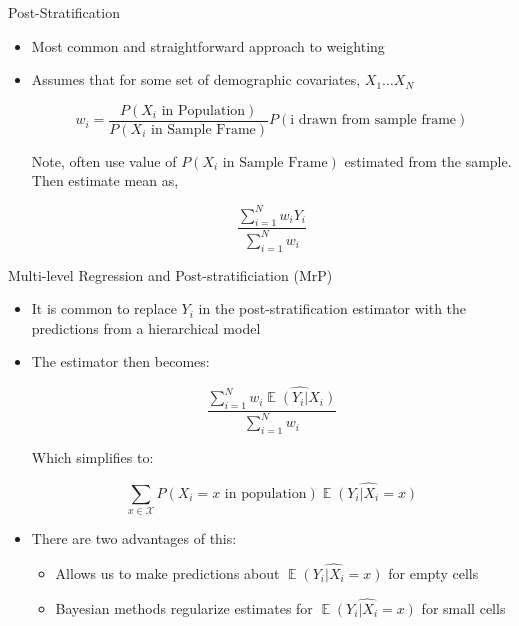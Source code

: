 \documentclass{beamer}
\DeclareMathOperator*{\E}{\mathbb{E}}
\begin{document}
\begin{frame}{Post-Stratification}
\begin{itemize} 
\item Most common and straightforward approach to weighting \pause 
\item Assumes that for some set of demographic covariates, $X_1 \dots X_N$ %

$$
w_i = \frac{P(X_i \text{ in Population})}{P(X_i \text{ in Sample Frame})} P(\text{i drawn from sample frame})
$$

Note, often use value of $P(X_i \text{ in Sample Frame})$ estimated from the sample. \pause Then estimate mean as, \pause 

$$
\frac{\sum_{i =1}^N w_i Y_i}{\sum_{i=1}^N w_i}
$$

\end{itemize}
\end{frame}


\begin{frame}{Multi-level Regression and Post-stratificiation (MrP)}
	\begin{itemize} 
		\item It is common to replace $Y_i$ in the post-stratification estimator with the predictions from a hierarchical model \pause 
		\item The estimator then becomes: 		
		
		$$
		\frac{\sum_{i =1}^N w_i \widehat{\E\left(Y_i|X_i \right)} }{\sum_{i=1}^N w_i}
		$$
		
		Which simplifies to:

		$$
		\sum_{x \in \mathcal{X}} P(X_i=x \text{ in population}) \widehat{\E\left(Y_i|X_i=x \right)}
			$$

		\pause 
		\item There are two advantages of this:
		
		\begin{itemize}
			\item Allows us to make predictions about $\widehat{\E\left(Y_i|X_i=x \right)}$ for empty cells
			\item Bayesian methods regularize estimates for $\widehat{\E\left(Y_i|X_i=x \right)}$ for small cells
		\end{itemize}
		
	\end{itemize}
\end{frame}
\end{document}
